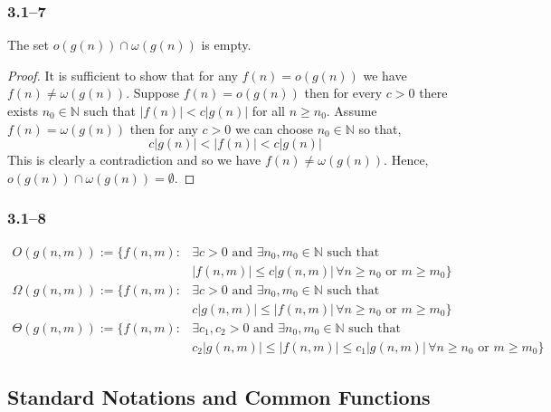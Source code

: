 \subsubsection*{3.1--7}

\begin{proposition}
	\label{prop:little-intersection}
	The set $o(g(n))\cap\omega(g(n))$ is empty.
\end{proposition}

\begin{proof}
	It is sufficient to show that for any $f(n)=o(g(n))$ we have $f(n)\neq \omega(g(n))$. Suppose $f(n)=o(g(n))$ then for every $c>0$ there exists $n_{0}\in\mathbb{N}$ such that $\left|f(n)\right| < c\left|g(n)\right|$ for all $n\geq n_{0}$. Assume $f(n)=\omega(g(n))$ then for any $c>0$ we can choose $n_{0}\in\mathbb{N}$ so that,
	\begin{equation*}
		c\left|g(n)\right| < \left|f(n)\right| < c\left|g(n)\right|
	\end{equation*}
	This is clearly a contradiction and so we have $f(n)\neq \omega(g(n))$. Hence, $o(g(n))\cap\omega(g(n))=\emptyset$.
\end{proof}

\subsubsection*{3.1--8}

\begin{equation*}
	\begin{aligned}
		O(g(n,m)) := \{f(n,m)\colon&\exists c>0 \text{ and } \exists n_{0},m_{0}\in\mathbb{N} \text{ such that }\\
		&\left|f(n,m)\right| \leq c\left|g(n,m)\right|\,\forall n\geq n_{0}\text{ or }m\geq m_{0}\}\\
		\Omega(g(n,m)) := \{f(n,m)\colon&\exists c>0 \text{ and } \exists n_{0},m_{0}\in\mathbb{N} \text{ such that }\\
		&c\left|g(n,m)\right| \leq \left|f(n,m)\right|\,\forall n\geq n_{0}\text{ or }m\geq m_{0}\}\\
		\Theta(g(n,m)) := \{f(n,m)\colon&\exists c_{1},c_{2}>0 \text{ and } \exists n_{0},m_{0}\in\mathbb{N} \text{ such that }\\
		&c_{2}\left|g(n,m)\right|\leq\left|f(n,m)\right| \leq c_{1}\left|g(n,m)\right|\,\forall n\geq n_{0}\text{ or }m\geq m_{0}\}
	\end{aligned}
\end{equation*}

\subsection{Standard Notations and Common Functions}

